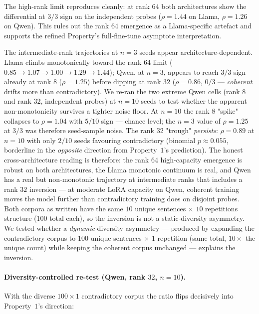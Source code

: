 \documentclass[11pt,a4paper]{article}
\begin{document}
The high\nobreakdash-rank limit reproduces cleanly: at rank $64$
both architectures show the differential at $3/3$ sign on the
independent probes ($\rho = 1.44$ on Llama, $\rho = 1.26$ on
Qwen).  This rules out the rank $64$ emergence as a
Llama\nobreakdash-specific artefact and supports
the refined Property's full\nobreakdash-fine\nobreakdash-tune
asymptote interpretation.

The intermediate\nobreakdash-rank trajectories at $n=3$ seeds
appear architecture\nobreakdash-dependent.  Llama climbs
monotonically toward the rank $64$ limit
($0.85 \to 1.07 \to 1.00 \to 1.29 \to 1.44$); Qwen, at $n=3$,
appears to reach $3/3$ sign already at rank $8$
($\rho = 1.25$) before dipping at rank $32$ ($\rho = 0.86$,
$0/3$ — \emph{coherent} drifts more than contradictory).  We
re\nobreakdash-ran the two extreme Qwen cells (rank $8$ and
rank $32$, independent probes) at $n=10$ seeds to test whether
the apparent non\nobreakdash-monotonicity survives a tighter
noise floor.  At $n=10$ the rank $8$ "spike" collapses to
$\rho = 1.04$ with $5/10$ sign — chance level; the
$n=3$ value of $\rho = 1.25$ at $3/3$ was therefore
seed\nobreakdash-sample noise.  The rank $32$ "trough"
\emph{persists}: $\rho = 0.89$ at $n=10$ with only $2/10$ seeds
favouring contradictory (binomial $p \approx 0.055$, borderline
in the \emph{opposite} direction from Property~$1$'s
prediction).  The honest cross\nobreakdash-architecture reading
is therefore: the rank $64$ high\nobreakdash-capacity emergence
is robust on both architectures, the Llama monotonic continuum
is real, and Qwen has a real but non\nobreakdash-monotonic
trajectory at intermediate ranks that includes a rank $32$
inversion — at moderate LoRA capacity on Qwen, coherent
training moves the model further than contradictory training
does on disjoint probes.  Both corpora as
written have the same $10$ unique sentences $\times$ $10$
repetitions structure ($100$ total each), so the inversion is
not a static\nobreakdash-diversity asymmetry.  We tested whether
a \emph{dynamic}\nobreakdash-diversity asymmetry — produced by
expanding the contradictory corpus to $100$ unique sentences
$\times$ $1$ repetition (same total, $10\!\times$ the unique
count) while keeping the coherent corpus unchanged — explains
the inversion.

\paragraph{Diversity-controlled re-test (Qwen, rank $32$,
$n = 10$).}
With the diverse $100\!\times\!1$ contradictory corpus the
ratio flips decisively into Property~$1$'s direction:
\end{document}
